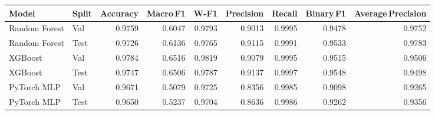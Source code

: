 \begin{tabular}{llrrrrrrr}
  \toprule
  Model & Split & Accuracy & Macro\,F1 & W-F1 & Precision & Recall & Binary\,F1 & Average\,Precision \\
  \midrule
  Random Forest & Val & 0.9759 & 0.6047 & 0.9793 & 0.9013 & 0.9995 & 0.9478 & 0.9752 \\
  Random Forest & Test & 0.9726 & 0.6136 & 0.9765 & 0.9115 & 0.9991 & 0.9533 & 0.9783 \\
  XGBoost & Val & 0.9784 & 0.6516 & 0.9819 & 0.9079 & 0.9995 & 0.9515 & 0.9506 \\
  XGBoost & Test & 0.9747 & 0.6506 & 0.9787 & 0.9137 & 0.9997 & 0.9548 & 0.9498 \\
  PyTorch MLP & Val & 0.9671 & 0.5079 & 0.9725 & 0.8356 & 0.9985 & 0.9098 & 0.9265 \\
  PyTorch MLP & Test & 0.9650 & 0.5237 & 0.9704 & 0.8636 & 0.9986 & 0.9262 & 0.9356 \\
  \bottomrule
\end{tabular}